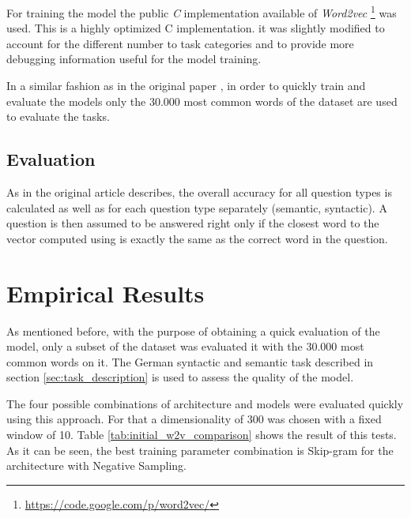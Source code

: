 For training  the model the public \emph{C} implementation available of
\textit{Word2vec} \footnote{\url{https://code.google.com/p/word2vec/}} was
used.  This is a highly optimized C implementation. it was slightly modified to account for the different
number to task categories and to provide more debugging information useful
for the model training. 

In a similar fashion as in the original paper
\cite{DBLP:journals/corr/abs-1301-3781}, in order to quickly train and evaluate the models
only the 30.000 most common words of the dataset are used to evaluate the tasks. 

\subsection{Evaluation}
\label{experiments:sub:evaluation}

As in the original article describes, the overall accuracy for all question
types is calculated as well as  for each question type separately (semantic,
syntactic). A question is then assumed to be answered right  only if the
closest word to the vector computed using  is exactly the same as the correct word in the
question. 
 
\section{Empirical Results}
\label{sec:sub_empirical_results}

As mentioned before, with the purpose of obtaining  a quick evaluation of the
model, only a subset of the dataset was evaluated it with the 30.000 
most common words on it. The German syntactic and semantic task described in
section \ref{sec:task_description} is used  to assess the quality of the
model. 


The four possible combinations of architecture and models were evaluated
quickly using this approach. For that a dimensionality of 300 was chosen with
a fixed window of 10. Table \ref{tab:initial_w2v_comparison} shows the result
of this tests. As it can be seen, the best training parameter combination is
Skip-gram for the architecture with Negative Sampling.








